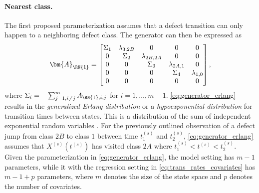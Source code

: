 \paragraph{Nearest class.} 
The first proposed parameterization assumes that a defect transition can only happen to a neighboring defect class. The generator can then be expressed as
\begin{align}
    \bm{A}_{\RN{1}} = \begin{bmatrix} 
    \Sigma_1 & \lambda_{3,2B} & 0 & 0 & 0 \\
    0 & \Sigma_2 & \lambda_{2B, 2A} & 0 & 0 \\
    0 & 0 & \Sigma_3 & \lambda_{2A, 1} & 0 \\
    0 & 0 & 0 & \Sigma_4 & \lambda_{1, 0} \\
    0 & 0 & 0 & 0 & 0 \\
    \end{bmatrix}, \label{eq:generator_erlang}
\end{align}
where $\Sigma_i = -\sum_{j=1, i \neq j}^m A_{\RN{1},i,j}$ for $i = 1, \dots, m-1$. 
\cref{eq:generator_erlang} results in the \textit{generalized Erlang distribution} or a \textit{hypoexponential distribution} for transition times between states. This is a distribution of the sum of independent exponential random variables \citep[Section 3.1]{bladt_nielsen}. For the previously outlined observation of a defect jump from class $2B$ to class $1$ between time $t_1^{(s)}$ and $t^{(s)}_2$, \cref{eq:generator_erlang} assumes that $X^{(s)}\left(t^{(s)}\right)$ has visited class $2A$ where $t^{(s)}_1 < t^{(s)} < t^{(s)}_2$.
Given the parameterization in \cref{eq:generator_erlang}, the model setting has $m-1$ parameters, while it with the regression setting in \cref{eq:trans_rates_covariates} has $m-1 + p$ parameters, where $m$ denotes the size of the state space and $p$ denotes the number of covariates.


